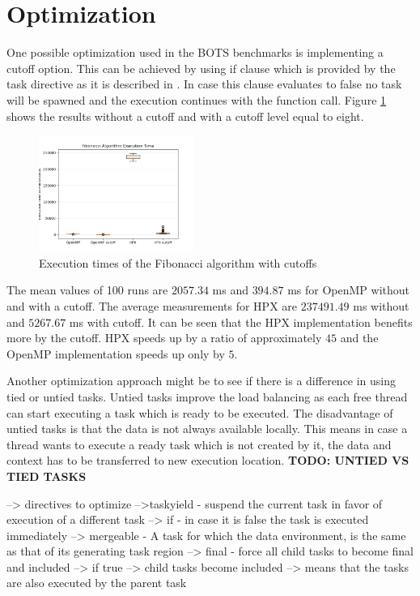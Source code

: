 \section{Optimization}
  One possible optimization used in the BOTS benchmarks is implementing a cutoff option.
  This can be achieved by using if clause which is provided by the task directive as it is described in \cite{LaGrone.2011}.
  In case this clause evaluates to false no task will be spawned and the execution continues with the function call.
  Figure \ref{fig:cutoff} shows the results without a cutoff and with a cutoff level equal to eight. 
\begin{figure}[h]
	\centering
	\includegraphics[width=0.45\textwidth]{figures/cutoff_plot.png}
	\caption{Execution times of the Fibonacci algorithm with cutoffs}
	\label{fig:cutoff}
\end{figure}

The mean values of 100 runs are \(2057.34\) ms and \(394.87\) ms for OpenMP without and with a cutoff.
The average measurements for HPX are \(237491.49\) ms without and \(5267.67\) ms with cutoff.
It can be seen that the HPX implementation benefits more by the cutoff.
HPX speeds up by a ratio of approximately \(45\) and the OpenMP implementation speeds up only by \(5\).
 
   
  Another optimization approach might be to see if there is a difference in using tied or untied tasks.
  Untied tasks improve the load balancing as each free thread can start executing a task which is ready to be executed.
  The disadvantage of untied tasks is that the data is not always available locally.
  This means in case a thread wants to execute a ready task which is not created by it, the data and context has to be transferred to new execution location.
  \textbf{TODO: UNTIED VS TIED TASKS}	
	
		
    
    
    \cite{MKlemm.2018}
 --> directives to optimize
 	-->taskyield - suspend the current task in favor of execution of a different task
 	--> if - in case it is false the task is executed immediately
 	--> mergeable - A task for which the data environment, is the same as that of its generating task region
 	--> final - force all child tasks to become final and included
 		--> if true --> child tasks become included --> means that the tasks are also executed by the parent task


